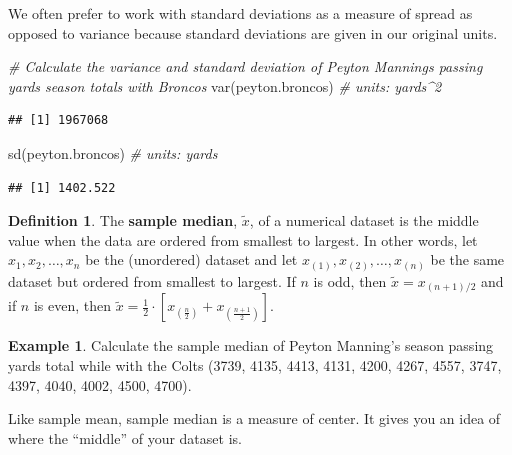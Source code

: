 \documentclass[
]{book}
\newenvironment{Shaded}{\begin{snugshade}}{\end{snugshade}}
\newcommand{\CommentTok}[1]{\textcolor[rgb]{0.56,0.35,0.01}{\textit{#1}}}
\newcommand{\FunctionTok}[1]{\textcolor[rgb]{0.00,0.00,0.00}{#1}}
\newcommand{\NormalTok}[1]{#1}
\theoremstyle{definition}
\newtheorem{definition}{Definition}[chapter]
\theoremstyle{definition}
\newtheorem{example}{Example}[chapter]
\theoremstyle{definition}
\theoremstyle{definition}
\theoremstyle{remark}
\begin{document}
We often prefer to work with standard deviations as a measure of spread as opposed to variance because standard deviations are given in our original units.

\begin{Shaded}
\begin{Highlighting}[]
\CommentTok{\# Calculate the variance and standard deviation of Peyton Manning\textquotesingle{}s passing yards season totals with Broncos}
\FunctionTok{var}\NormalTok{(peyton.broncos) }\CommentTok{\# units: yards\^{}2}
\end{Highlighting}
\end{Shaded}

\begin{verbatim}
## [1] 1967068
\end{verbatim}

\begin{Shaded}
\begin{Highlighting}[]
\FunctionTok{sd}\NormalTok{(peyton.broncos) }\CommentTok{\# units: yards}
\end{Highlighting}
\end{Shaded}

\begin{verbatim}
## [1] 1402.522
\end{verbatim}

\begin{definition}
The \textbf{sample median}, \(\tilde{x}\), of a numerical dataset is the middle value when the data are ordered from smallest to largest. In other words, let \(x_1, x_2, \ldots, x_n\) be the (unordered) dataset and let \(x_{(1)},x_{(2)}, \ldots, x_{(n)}\) be the same dataset but ordered from smallest to largest. If \(n\) is odd, then \(\tilde{x} = x_{(n+1)/2}\) and if \(n\) is even, then \(\tilde{x} = \frac{1}{2} \cdot \left[x_{\left(\frac{n}{2}\right)} + x_{\left(\frac{n+1}{2}\right)}\right]\).
\end{definition}

\begin{example}
Calculate the sample median of Peyton Manning's season passing yards total while with the Colts (3739, 4135, 4413, 4131, 4200, 4267, 4557, 3747, 4397, 4040, 4002, 4500, 4700).
\end{example}

\hfill\break
\hfill\break
\hfill\break
\hfill\break
\hfill\break

Like sample mean, sample median is a measure of center. It gives you an idea of where the ``middle'' of your dataset is.
\end{document}
